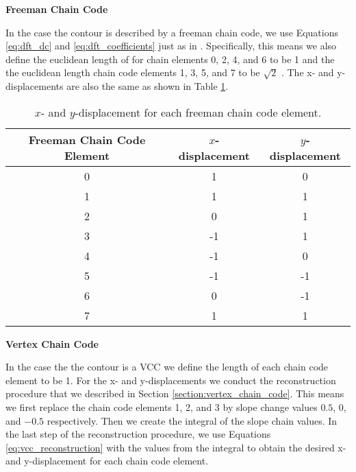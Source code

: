 \documentclass[thesis.tex]{subfiles}
\begin{document}
\textbf{Freeman Chain Code}

In the case the contour is described by a freeman chain code, we use Equations \ref{eq:dft_dc} and \ref{eq:dft_coefficients} just as in \cite{giardinia}. Specifically, this means we also define the euclidean length of for chain elements 0, 2, 4, and 6 to be 1 and the the euclidean length chain code elements 1, 3, 5, and 7 to be $\sqrt{2}$ . The x- and y-displacements are also the same as shown in Table \ref{table:freeman_displacements}.

\begin{table}[h!]
\centering
 \begin{tabular}{c c c} 
 \toprule
 Freeman Chain Code Element &  $x$-displacement & $y$-displacement\\ [0.5ex] 
\midrule
 0 & 1 & 0 \\ 
 1 & 1 & 1\\
 2 & 0 & 1\\
 3 & -1 & 1\\
 4 & -1 & 0\\
 5 & -1 & -1\\
 6 & 0 & -1\\
 7 & 1 & 1\\
\bottomrule
\end{tabular}
\caption{$x$- and $y$-displacement for each freeman chain code element.}
\label{table:freeman_displacements}
\end{table}

\textbf{Vertex Chain Code}

In the case the the contour is a VCC we define the length of each chain code element to be 1. For the x- and y-displacements we conduct the reconstruction procedure that we described in Section \ref{section:vertex_chain_code}. This means we first replace the chain code elements 1, 2, and 3 by slope change values $0.5$, $0$, and $-0.5$ respectively. Then we create the integral of the slope chain values. In the last step of the reconstruction procedure, we use Equations \ref{eq:vcc_reconstruction} with the values from the integral to obtain the desired x- and y-displacement for each chain code element.
\end{document}
